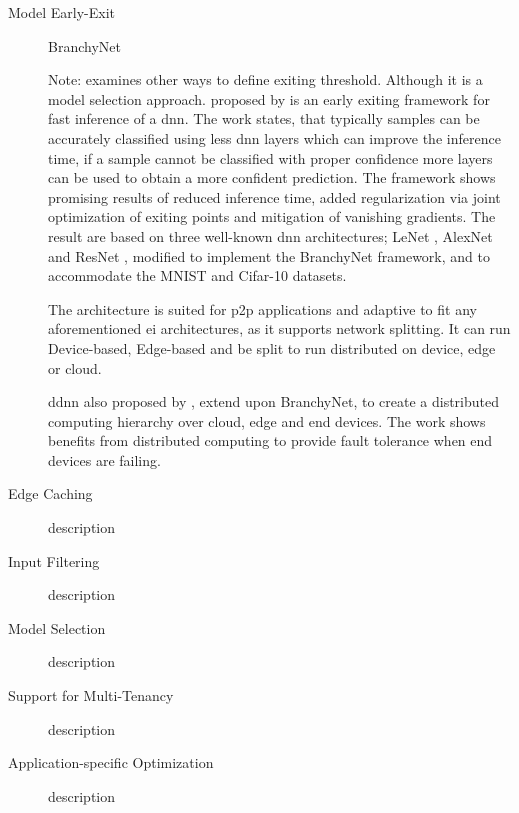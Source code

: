 \begin{description}
	\item[Model Early-Exit] BranchyNet
	
	Note: \cite{park_big/little_2015} examines other ways to define exiting threshold. Although it is a model selection approach.
	 \cite{teerapittayanon_branchynet:_2016} proposed by \citeauthor{teerapittayanon_branchynet:_2016} is an early exiting framework for fast inference of a \gls{dnn}. The work states, that typically samples can be accurately classified using less \gls{dnn} layers which can improve the inference time, if a sample cannot be classified with proper confidence more layers can be used to obtain a more confident prediction. The framework shows promising results of reduced inference time, added regularization via joint optimization of exiting points and mitigation of vanishing gradients. The result are based on three well-known \gls{dnn} architectures; LeNet \cite{lecun_lecun-98.pdf_1998}, AlexNet \cite{krizhevsky_imagenet_2017} and ResNet \cite{he_deep_2015}, modified to implement the BranchyNet framework, and to accommodate the MNIST \cite{lecun_mnist_2010} and Cifar-10 \cite{krizhevsky_cifar-10_nodate} datasets.  
	
	The architecture is suited for \gls{p2p} applications and adaptive to fit any aforementioned \gls{ei} architectures, as it supports network splitting. It can run Device-based, Edge-based and be split to run distributed on device, edge or cloud.
	
	\gls{ddnn} \cite{teerapittayanon_distributed_2017} also proposed by \citeauthor{teerapittayanon_distributed_2017}, extend upon BranchyNet,  to  create a distributed computing hierarchy over cloud, edge and end devices. The work shows benefits from distributed computing to provide fault tolerance when end devices are failing.
	
	\item[Edge Caching] description
	\item[Input Filtering] description
	\item[Model Selection] description
	\item[Support for Multi-Tenancy] description
	\item[Application-specific Optimization] description
\end{description}

